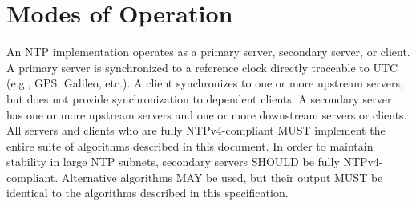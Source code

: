 \chapter{Modes of Operation}

An NTP implementation operates as a primary server, secondary server,
or client. A primary server is synchronized to a reference clock
directly traceable to UTC (e.g., GPS, Galileo, etc.). A client
synchronizes to one or more upstream servers, but does not provide
synchronization to dependent clients. A secondary server has one or
more upstream servers and one or more downstream servers or clients.
All servers and clients who are fully NTPv4-compliant MUST implement
the entire suite of algorithms described in this document. In order
to maintain stability in large NTP subnets, secondary servers SHOULD
be fully NTPv4-compliant. Alternative algorithms MAY be used, but
their output MUST be identical to the algorithms described in this
specification.
